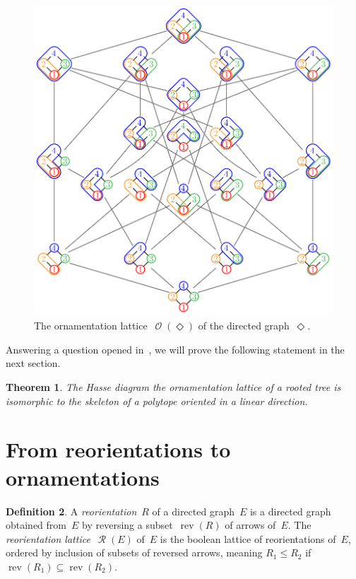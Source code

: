 \documentclass{amsart}
\newtheorem{theorem}{Theorem}[section]
\theoremstyle{definition}
\newtheorem{definition}[theorem]{Definition}
\renewcommand{\c}[1]{\mathcal{#1}} %
\newcommand{\darkblue}{\color{darkblue}} %
\newcommand{\defn}[1]{\textsl{\darkblue #1}} %
\DeclareMathOperator{\Orn}{\c{O}}  %
\DeclareMathOperator{\Reori}{\c{R}}  %
\DeclareMathOperator{\rev}{rev} %
\newcommand{\Dgraph}{\boldsymbol{\Diamond}} %
\begin{document}
\begin{figure}
	\centerline{\includegraphics[scale=.8]{ornamentationsD}}
	\caption{The ornamentation lattice~$\Orn(\Dgraph)$ of the directed graph~$\Dgraph$.}
	\label{fig:ornamentationsD}
\end{figure}

Answering a question opened in~\cite{DelfantSack}, we will prove the following statement in the next section.

\begin{theorem}
The Hasse diagram the ornamentation lattice of a rooted tree is isomorphic to the skeleton of a polytope oriented in a linear direction. 
\end{theorem}


\section{From reorientations to ornamentations}

\begin{definition}
A \defn{reorientation}~$R$ of a directed graph~$E$ is a directed graph obtained from~$E$ by reversing a subset~$\rev(R)$ of arrows of~$E$.
The \defn{reorientation lattice}~$\Reori(E)$ of~$E$ is the boolean lattice of reorientations of~$E$, ordered by inclusion of subsets of reversed arrows, meaning $R_1 \le R_2$ if ${\rev(R_1) \subseteq \rev(R_2)}$.
\end{definition}
\end{document}
